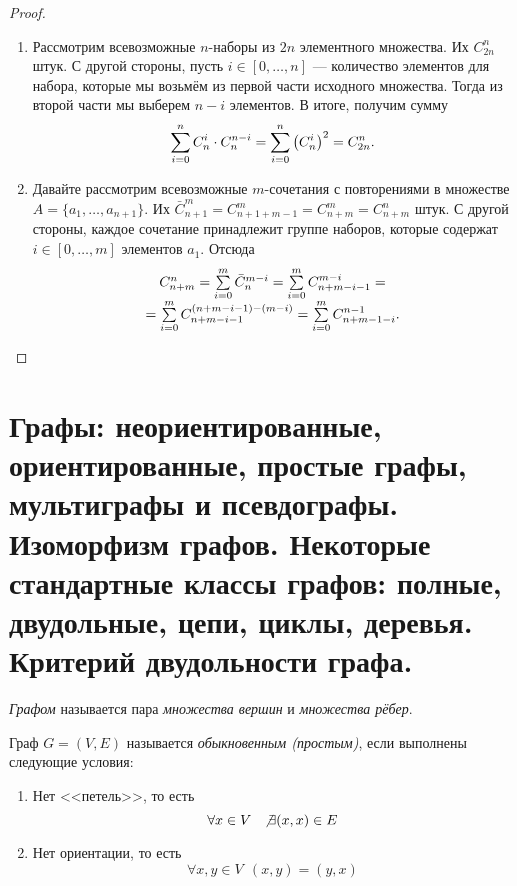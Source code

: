 \begin{multicols}{2}
\begin{proof}
\begin{enumerate}
        \item Рассмотрим всевозможные $n$-наборы из $2n$ элементного множества. Их $C_{2n}^n$ штук. С другой стороны, пусть $i \in [0, \ldots, n]$ --- количество элементов для набора, которые мы возьмём из первой части исходного множества. Тогда из второй части мы выберем $n - i$ элементов. В итоге, получим сумму
        \[
          \sum\limits_{i = 0}^n C_n^i \cdot C_n^{n - i} = \sum\limits_{i = 0}^n \left(C_n^i\right)^2 = C_{2n}^n.
        \]
        
        \item Давайте рассмотрим всевозможные $m$-сочетания с повторениями в множестве $A = \{a_1, \ldots, a_{n + 1}\}$. Их $\bar{C}_{n + 1}^m = C_{n + 1 + m - 1}^m = C_{n + m}^m = C_{n + m}^n$ штук. С другой стороны, каждое сочетание принадлежит группе наборов, которые содержат $i \in [0, \ldots, m]$ элементов $a_1$. Отсюда
        \[
          \begin{array}{c}
            C_{n + m}^n = \sum\limits_{i = 0}^m \bar{C}_n^{m - i} = \sum\limits_{i = 0}^m C_{n + m - i - 1}^{m - i} = \\ = \sum\limits_{i = 0}^m C_{n + m - i - 1}^{(n + m - i - 1) - (m - i)} = \sum\limits_{i = 0}^m C_{n + m - 1 - i}^{n - 1}.            
          \end{array}
        \]
      \end{enumerate}
    \end{proof}
    \section{Графы: неориентированные, ориентированные, простые графы, мультиграфы и
    псевдографы. Изоморфизм графов. Некоторые стандартные классы графов: полные,
    двудольные, цепи, циклы, деревья. Критерий двудольности графа.}
    \begin{definition}{}{}
      \textit{Графом} называется пара \textit{множества вершин} и \textit{множества рёбер}.
    \end{definition}
    
    \begin{definition}{}{}
      Граф $G = (V, E)$ называется \textit{обыкновенным (простым)}, если выполнены следующие условия:
      \begin{enumerate}
        \item Нет <<петель>>, то есть
        \[
          \forall x \in V\ \ \not\exists (x, x) \in E
        \]
        
        \item Нет ориентации, то есть
        \[
          \forall x, y \in V\ \ (x, y) = (y, x)
        \]
        

\end{enumerate}
\end{definition}
\end{multicols}
